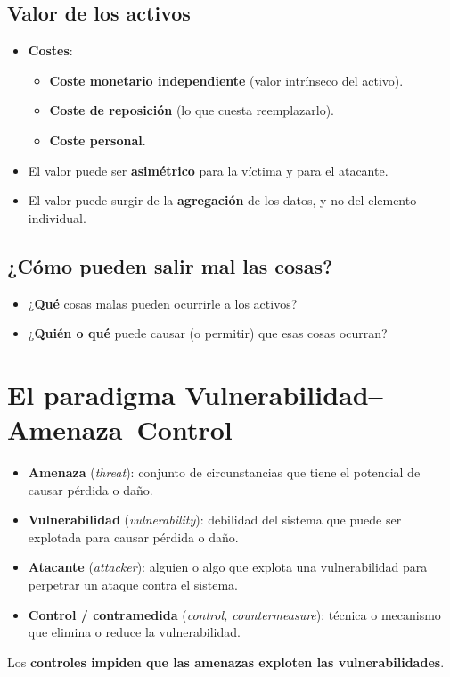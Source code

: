 \documentclass[11pt,a4paper]{report}
\begin{document}
\subsection{Valor de los activos}
\begin{itemize}
  \item \textbf{Costes}:
    \begin{itemize}
      \item \textbf{Coste monetario independiente} (valor intrínseco del activo).
      \item \textbf{Coste de reposición} (lo que cuesta reemplazarlo).
      \item \textbf{Coste personal}.
    \end{itemize}
  \item El valor puede ser \textbf{asimétrico} para la víctima y para el atacante.
  \item El valor puede surgir de la \textbf{agregación} de los datos, y no del elemento individual.
\end{itemize}

\subsection{¿Cómo pueden salir mal las cosas?}
\begin{itemize}
  \item ¿\textbf{Qué} cosas malas pueden ocurrirle a los activos?
  \item ¿\textbf{Quién o qué} puede causar (o permitir) que esas cosas ocurran?
\end{itemize}

\section{El paradigma Vulnerabilidad--Amenaza--Control}

\begin{importante}
\begin{itemize}
  \item \textbf{Amenaza} (\emph{threat}): conjunto de circunstancias que tiene el potencial de causar pérdida o daño.
  \item \textbf{Vulnerabilidad} (\emph{vulnerability}): debilidad del sistema que puede ser explotada para causar pérdida o daño.
  \item \textbf{Atacante} (\emph{attacker}): alguien o algo que explota una vulnerabilidad para perpetrar un ataque contra el sistema.
  \item \textbf{Control / contramedida} (\emph{control, countermeasure}): técnica o mecanismo que elimina o reduce la vulnerabilidad.
\end{itemize}
Los \textbf{controles impiden que las amenazas exploten las vulnerabilidades}.
\end{importante}
\end{document}
